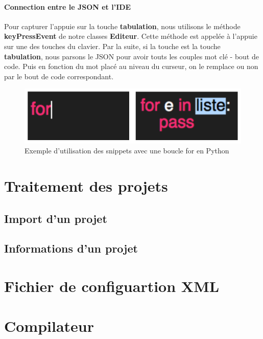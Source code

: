\documentclass[a4paper,12pt]{article}
\begin{document}
		\paragraph{Connection entre le JSON et l'IDE}

			Pour capturer l'appuie sur la touche \textbf{tabulation}, nous utilisons le méthode \textbf{keyPressEvent} de notre classes \textbf{Editeur}. Cette méthode est appelée à l'appuie sur une des touches du clavier. Par la suite, si la touche est la touche \textbf{tabulation}, nous parsons le JSON pour avoir touts les couples mot clé - bout de code. Puis en fonction du mot placé au niveau du curseur, on le remplace ou non par le bout de code correspondant.

			\begin{figure}[h!]
				\begin{center}
					\includegraphics[scale=0.7]{images/exampleFor}
					\caption{Exemple d'utilisation des snippets avec une boucle for en Python}
				\end{center}
			\end{figure}

	
\section{Traitement des projets}

	\subsection{Import d'un projet}
	
	\subsection{Informations d'un projet}
	
	
\section{Fichier de configuartion XML}


\section{Compilateur}
\end{document}
